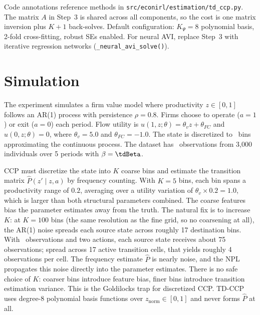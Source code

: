 \documentclass[10pt]{article}
\begin{document}
Code annotations reference methods in \texttt{src/econirl/estimation/td\_ccp.py}.
The matrix $A$ in Step~3 is shared across all components, so the cost is one matrix inversion plus $K+1$ back-solves.
Default configuration: $K_\Psi = 8$ polynomial basis, 2-fold cross-fitting, robust SEs enabled.
For neural AVI, replace Step~3 with iterative regression networks (\texttt{\_neural\_avi\_solve()}).

\section{Simulation}



The experiment simulates a firm value model where productivity $z \in [0,1]$ follows an AR(1) process with persistence $\rho = 0.8$.
Firms choose to operate ($a=1$) or exit ($a=0$) each period.
Flow utility is $u(1, z;\theta) = \theta_v z + \theta_{FC}$ and $u(0, z;\theta) = 0$, where $\theta_v = 5.0$ and $\theta_{FC} = -1.0$.
The state is discretized to \tdNstates\ bins approximating the continuous process.
The dataset has \tdNobs\ observations from 3{,}000 individuals over 5 periods with $\beta = \tdBeta$.

CCP must discretize the state into $K$ coarse bins and estimate the transition matrix $\hat P(z' \mid z, a)$ by frequency counting.
With $K = 5$ bins, each bin spans a productivity range of $0.2$, averaging over a utility variation of $\theta_v \times 0.2 = 1.0$, which is larger than both structural parameters combined.
The coarse features bias the parameter estimates away from the truth.
The natural fix is to increase $K$: at $K = 100$ bins (the same resolution as the fine grid, so no coarsening at all), the AR(1) noise spreads each source state across roughly 17 destination bins.
With \tdNobs\ observations and two actions, each source state receives about 75 observations; spread across 17 active transition cells, that yields roughly 4 observations per cell.
The frequency estimate $\hat P$ is nearly noise, and the NPL propagates this noise directly into the parameter estimates.
There is no safe choice of $K$: coarser bins introduce feature bias, finer bins introduce transition estimation variance.
This is the Goldilocks trap for discretized CCP.
TD-CCP uses degree-8 polynomial basis functions over $z_{\mathrm{norm}} \in [0,1]$ and never forms $\hat P$ at all.
\end{document}
